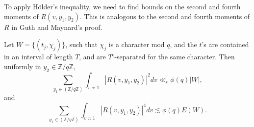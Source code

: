 To apply H\"older's inequality, we need to find bounds on the second and fourth moments of $R(v,y_1,y_2)$. This is analogous to the second and fourth moments of $R$ in Guth and Maynard's proof.
\begin{lemma} \label{secondmoment}
    Let $ W=\{(t_j,\chi_j)\}$, such that $\chi_j$ is a character mod $q$, and the $t$'s are contained in an interval of length $T$, and are $T^\epsilon$-separated for the same character. Then uniformly in $y_2\in \mathbb{Z}/q\mathbb{Z}$, \[
        \sum_{y_1\in (\mathbb{Z}/q\mathbb{Z})} \int_{v\asymp 1} 
        \left|R\left(v,y_1,y_2\right)\right|^2dv \ll_{\epsilon} \phi(q)| W|,
    \]
     and \[
        \sum_{y_1\in (\mathbb{Z}/q\mathbb{Z})} \int_{v\asymp 1} 
        \left|R\left(v,y_1,y_2\right)\right|^4dv  \lesssim \phi(q)E( W).
    \]
\end{lemma}
